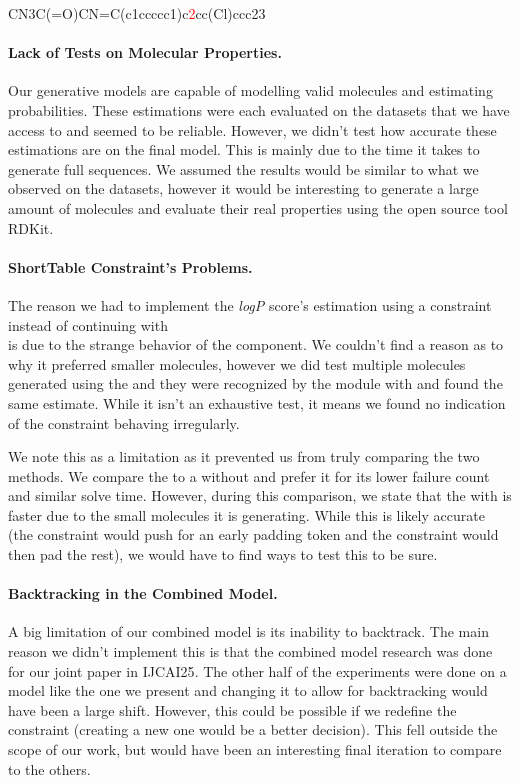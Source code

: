 \documentclass[../Document.tex]{subfiles}
\begin{document}
{
    \centering
    CN3C(=O)CN=C(c1ccccc1)c\textcolor{red}{2}cc(Cl)ccc23
}


\paragraph{Lack of Tests on Molecular Properties.}
Our generative models are capable of modelling valid molecules and estimating probabilities.
These estimations were each evaluated on the datasets that we have access to and seemed to be reliable.
However, we didn't test how accurate these estimations are on the final model.
This is mainly due to the time it takes to generate full sequences.
We assumed the results would be similar to what we observed on the datasets, however it would be interesting to generate a large amount of molecules and evaluate their real properties using the open source tool RDKit.


\paragraph{ShortTable Constraint's \bp Problems.}
The reason we had to implement the \emph{logP} score's estimation using a \costregular constraint instead of continuing with\\ \shortTable is due to the strange behavior of the \bp component.
We couldn't find a reason as to why it preferred smaller molecules, however we did test multiple molecules generated using the \costregular and they were recognized by the module with \shortTable and found the same estimate.
While it isn't an exhaustive test, it means we found no indication of the constraint behaving irregularly.

We note this as a limitation as it prevented us from truly comparing the two methods.
We compare the \costregular to a \shortTable without \bp and prefer it for its lower failure count and similar solve time.
However, during this comparison, we state that the \shortTable with \bp is faster due to the small molecules it is generating.
While this is likely accurate (the \shortTable constraint would push for an early padding token and the \grammar constraint would then pad the rest), we would have to find ways to test this to be sure.


\paragraph{Backtracking in the Combined Model.}
A big limitation of our combined model is its inability to backtrack.
The main reason we didn't implement this is that the combined model research was done for our joint paper in IJCAI25\cite{ijcai:saikali}.
The other half of the experiments were done on a model like the one we present and changing it to allow for backtracking would have been a large shift.
However, this could be possible if we redefine the \oracle constraint (creating a new one would be a better decision).
This fell outside the scope of our work, but would have been an interesting final iteration to compare to the others.
\end{document}
